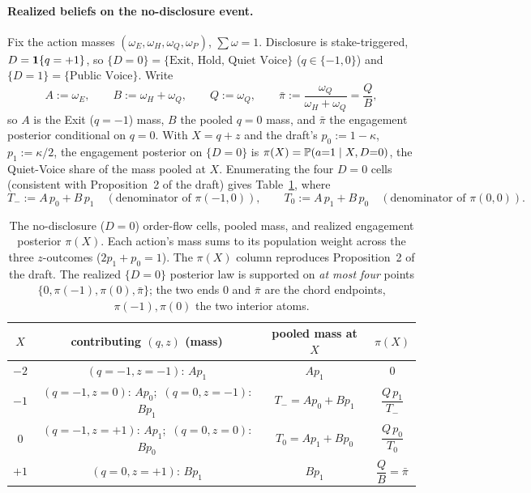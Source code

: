\paragraph{Realized beliefs on the no-disclosure event.}
Fix the action masses $(\omega_E,\omega_H,\omega_Q,\omega_P)$, $\sum\omega=1$.
Disclosure is stake-triggered, $D=\mathbf{1}\{q=+1\}$, so $\{D=0\}=\{\text{Exit, Hold,
Quiet Voice}\}$ ($q\in\{-1,0\}$) and $\{D=1\}=\{\text{Public Voice}\}$. Write
\begin{equation}\label{eq:abc}
   A:=\omega_E,\qquad B:=\omega_H+\omega_Q,\qquad Q:=\omega_Q,\qquad
   \bar\pi:=\frac{\omega_Q}{\omega_H+\omega_Q}=\frac{Q}{B},
\end{equation}
so $A$ is the Exit ($q=-1$) mass, $B$ the pooled $q=0$ mass, and $\bar\pi$ the
engagement posterior conditional on $q=0$. With $X=q+z$ and the draft's
$p_0:=1-\kappa$, $p_1:=\kappa/2$, the engagement posterior on $\{D=0\}$ is
$\pi(X)=\mathbb{P}(a{=}1\mid X,D{=}0)$, the Quiet-Voice share of the mass pooled at
$X$. Enumerating the four $D=0$ cells (consistent with Proposition~2 of the
draft) gives Table~\ref{tab:D0cells}, where
\begin{equation}\label{eq:Tdef}
   T_-:=A\,p_0+B\,p_1 \quad(\text{denominator of }\pi(-1,0)),\qquad
   T_0:=A\,p_1+B\,p_0 \quad(\text{denominator of }\pi(0,0)).
\end{equation}

\begin{table}[h]
\centering
\renewcommand{\arraystretch}{1.35}
\begin{tabular}{cccc}
\toprule
$X$ & contributing $(q,z)$ (mass) & pooled mass at $X$ & $\pi(X)$\\
\midrule
$-2$ & $(q{=}{-}1,z{=}{-}1)$: $A p_1$ & $A p_1$ & $0$\\
$-1$ & $(q{=}{-}1,z{=}0)$: $A p_0$;\ $(q{=}0,z{=}{-}1)$: $B p_1$ & $T_-=A p_0+B p_1$ & $\dfrac{Q\,p_1}{T_-}$\\
$0$  & $(q{=}{-}1,z{=}{+}1)$: $A p_1$;\ $(q{=}0,z{=}0)$: $B p_0$ & $T_0=A p_1+B p_0$ & $\dfrac{Q\,p_0}{T_0}$\\
$+1$ & $(q{=}0,z{=}{+}1)$: $B p_1$ & $B p_1$ & $\dfrac{Q}{B}=\bar\pi$\\
\bottomrule
\end{tabular}
\caption{The no-disclosure ($D=0$) order-flow cells, pooled mass, and realized
engagement posterior $\pi(X)$. Each action's mass sums to its population weight
across the three $z$-outcomes ($2p_1+p_0=1$). The $\pi(X)$ column reproduces
Proposition~2 of the draft. The realized $\{D=0\}$ posterior law is supported on
\emph{at most four} points $\{0,\pi(-1),\pi(0),\bar\pi\}$; the two ends $0$ and
$\bar\pi$ are the chord endpoints, $\pi(-1),\pi(0)$ the two interior atoms.}
\label{tab:D0cells}
\end{table}

